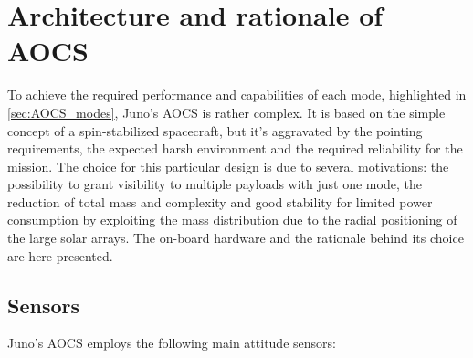 \section{Architecture and rationale of AOCS}
\label{sec:AOCS_architecture_rationale}

To achieve the required performance and capabilities of each mode, highlighted in \autoref{sec:AOCS_modes}, Juno's AOCS is rather complex.
It is based on the simple concept of a spin-stabilized spacecraft, but it's aggravated by the pointing requirements, the expected harsh environment and the required reliability for the mission.
The choice for this particular design is due to several motivations: the possibility to grant visibility to multiple payloads with just one mode, the reduction of total mass and complexity and good stability for limited power consumption by exploiting the mass distribution due to the radial positioning of the large solar arrays.
The on-board hardware and the rationale behind its choice are here presented.

\subsection{Sensors}
\label{subsec:Sensors}

Juno's AOCS employs the following main attitude sensors:

